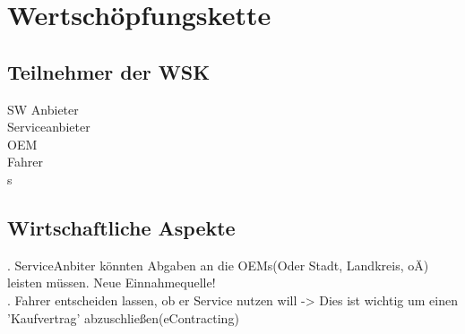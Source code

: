 \section{Wertschöpfungskette}
\subsection{Teilnehmer der WSK}
SW Anbieter\\
Serviceanbieter\\
OEM\\
Fahrer\\s
\subsection{Wirtschaftliche Aspekte}\label{:wirtschaftlicheaspekte}
. ServiceAnbiter könnten Abgaben an die OEMs(Oder Stadt, Landkreis, oÄ) leisten müssen. Neue Einnahmequelle!\\
. Fahrer entscheiden lassen, ob er Service nutzen will -> Dies ist wichtig um einen 'Kaufvertrag' abzuschließen(eContracting) 